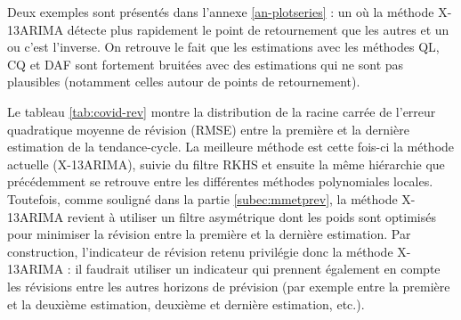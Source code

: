\documentclass[
  11pt,
  french,
  a4paper]{article}
\newcommand\1{\mathds{1}}
\begin{document}
Deux exemples sont présentés dans l'annexe \ref{an-plotseries} : un où la méthode X-13ARIMA détecte plus rapidement le point de retournement que les autres et un ou c'est l'inverse.
On retrouve le fait que les estimations avec les méthodes QL, CQ et DAF sont fortement bruitées avec des estimations qui ne sont pas plausibles (notamment celles autour de points de retournement).

Le tableau \ref{tab:covid-rev} montre la distribution de la racine carrée de l'erreur quadratique moyenne de révision (RMSE) entre la première et la dernière estimation de la tendance-cycle.
La meilleure méthode est cette fois-ci la méthode actuelle (X-13ARIMA), suivie du filtre RKHS et ensuite la même hiérarchie que précédemment se retrouve entre les différentes méthodes polynomiales locales.
Toutefois, comme souligné dans la partie \ref{subec:mmetprev}, la méthode X-13ARIMA revient à utiliser un filtre asymétrique dont les poids sont optimisés pour minimiser la révision entre la première et la dernière estimation.
Par construction, l'indicateur de révision retenu privilégie donc la méthode X-13ARIMA : il faudrait utiliser un indicateur qui prennent également en compte les révisions entre les autres horizons de prévision (par exemple entre la première et la deuxième estimation, deuxième et dernière estimation, etc.).
\end{document}
